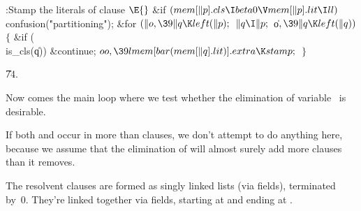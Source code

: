 \B{}:Stamp the literals of clause \X${}%
\E{}$\6
\&{if} ${}(\\{mem}[\|p].\\{cls}\I\\{beta0}\V\\{mem}[\|p].\\{lit}\I\\{ll}){}$\1\5
\\{confusion}(\.{"partitioning"});\2\6
\&{for} ${}(\|o,\39\|q\K\\{left}(\|p);{}$ ${}\|q\I\|p;{}$ \|o${},\39\|q\K%
\\{left}(\|q)){}$\5
${}\{{}$\1\6
\&{if} (\\{is\_cls}(\|q))\1\5
\&{continue};\2\6
${}\\{oo},\39\\{lmem}[\\{bar}(\\{mem}[\|q].\\{lit})].\\{extra}\K\\{stamp};{}$\6
\4${}\}{}$\2\par
\U74.\fi

Now comes the main loop where we test whether the
elimination
of variable~ is desirable.

If both  and  occur in more than 
clauses, we don't
attempt to do anything here, because we assume
that the elimination of  will almost surely add more clauses than it
removes.

The resolvent clauses are formed as singly linked lists (via 
fields),
terminated by~0. They're linked together via  fields, starting
at  and ending at .


